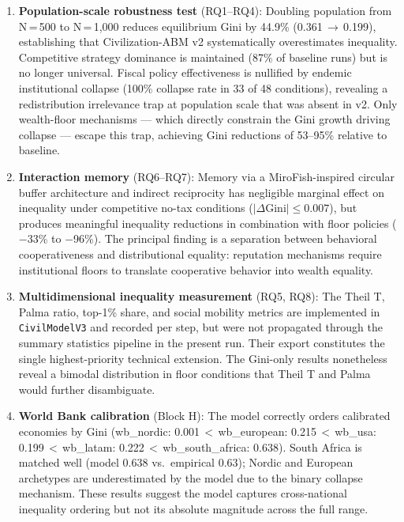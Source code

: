 \documentclass[12pt, letterpaper]{article}
\begin{document}
\begin{enumerate}
  \item \textbf{Population-scale robustness test} (RQ1--RQ4): Doubling
    population from N\,=\,500 to N\,=\,1,000 reduces equilibrium Gini by
    44.9\% (0.361\,$\to$\,0.199), establishing that Civilization-ABM
    v2 systematically overestimates inequality. Competitive strategy
    dominance is maintained (87\% of baseline runs) but is no longer
    universal. Fiscal policy effectiveness is nullified by endemic
    institutional collapse (100\% collapse rate in 33 of 48 conditions),
    revealing a redistribution irrelevance trap at population scale
    that was absent in v2. Only wealth-floor mechanisms --- which
    directly constrain the Gini growth driving collapse --- escape this
    trap, achieving Gini reductions of 53--95\% relative to baseline.

  \item \textbf{Interaction memory} (RQ6--RQ7): Memory via a
    MiroFish-inspired circular buffer architecture \citep{mirofish2025}
    and indirect reciprocity \citep{nowak1998indirect} has negligible
    marginal effect on inequality under competitive no-tax conditions
    ($|\Delta\text{Gini}| \leq 0.007$), but produces meaningful
    inequality reductions in combination with floor policies
    ($-$33\% to $-$96\%). The principal finding is a separation between
    behavioral cooperativeness and distributional equality: reputation
    mechanisms require institutional floors to translate cooperative
    behavior into wealth equality.

  \item \textbf{Multidimensional inequality measurement} (RQ5, RQ8):
    The Theil T, Palma ratio, top-1\% share, and social mobility metrics
    are implemented in \texttt{CivilModelV3} and recorded per step,
    but were not propagated through the summary statistics pipeline in
    the present run. Their export constitutes the single highest-priority
    technical extension. The Gini-only results nonetheless reveal a
    bimodal distribution in floor conditions that Theil T and Palma
    would further disambiguate.

  \item \textbf{World Bank calibration} (Block H): The model correctly
    orders calibrated economies by Gini (wb\_nordic: 0.001\,$<$\,wb\_european:
    0.215\,$<$\,wb\_usa: 0.199\,$<$\,wb\_latam: 0.222\,$<$\,wb\_south\_africa:
    0.638). South Africa is matched well (model 0.638 vs.\ empirical 0.63);
    Nordic and European archetypes are underestimated by the model due to
    the binary collapse mechanism. These results suggest the model captures
    cross-national inequality ordering but not its absolute magnitude
    across the full range.
\end{enumerate}
\end{document}

